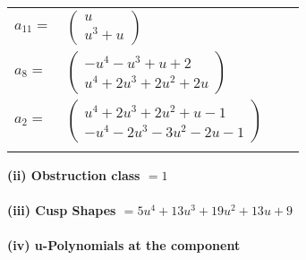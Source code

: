 \documentclass[1p]{elsarticle_modified}
\theoremstyle{definition}
\begin{document}
\begin{tabular}{m{7pt} m{180pt} m{7pt} m{180pt} }
\flushright $a_{11}=$&$\begin{pmatrix}u\\u^3+u\end{pmatrix}$ \\
\flushright $a_{8}=$&$\begin{pmatrix}- u^4- u^3+u+2\\u^4+2 u^3+2 u^2+2 u\end{pmatrix}$ \\
\flushright $a_{2}=$&$\begin{pmatrix}u^4+2 u^3+2 u^2+u-1\\- u^4-2 u^3-3 u^2-2 u-1\end{pmatrix}$\\&\end{tabular}
\flushleft \textbf{(ii) Obstruction class $= 1$}\\~\\
\flushleft \textbf{(iii) Cusp Shapes $= 5 u^4+13 u^3+19 u^2+13 u+9$}\\~\\
\newpage\renewcommand{\arraystretch}{1}
\flushleft \textbf{(iv) u-Polynomials at the component}\newline \\
\end{document}
